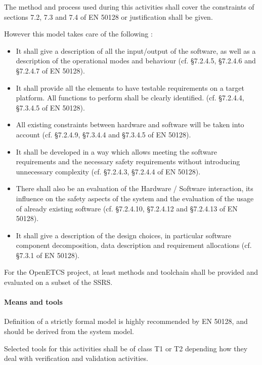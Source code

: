 The method and process used during this activities shall cover the constraints of sections 7.2, 7.3 and 7.4 of EN 50128 or justification shall be given.


However this model takes care of the following :

\begin{itemize}
\item It shall give a description of all the input/output of the software, as well as a description of the operational modes and behaviour (cf. §7.2.4.5,  §7.2.4.6 and  §7.2.4.7 of EN 50128). 
\item It shall provide all the elements to have testable requirements on a target platform. All functions to perform shall be clearly identified. (cf. §7.2.4.4, §7.3.4.5  of EN 50128).
\item All existing constraints between hardware and software will be taken into account (cf. §7.2.4.9, §7.3.4.4 and §7.3.4.5 of EN 50128).
\item It shall be developed in a way which allows meeting the software
requirements and the necessary safety requirements without introducing
unnecessary complexity (cf. §7.2.4.3,  §7.2.4.4  of EN 50128).
\item There shall also be an evaluation of the
Hardware / Software interaction, its influence on the safety aspects of the system and the
evaluation of the usage of already existing software  (cf. §7.2.4.10,  §7.2.4.12 and §7.2.4.13  of EN 50128).
\item It shall give a  description of the design choices, in particular software component decomposition, data description and requirement allocations (cf. §7.3.1 of EN 50128).
\end{itemize}

For the OpenETCS project, at least methods and toolchain shall be provided and evaluated on a subset of the SSRS.

\paragraph{Means and tools}
\label{sec:sw-means}

Definition of a strictly formal  model is highly recommended by EN 50128, and should be derived from  the system  model.


Selected tools for this activities shall  be of class T1 or T2  depending how they deal  with verification and validation activities.


